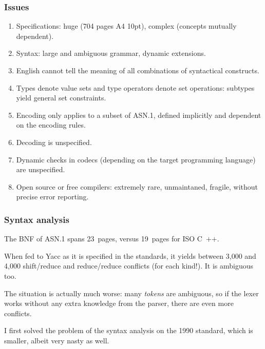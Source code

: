 \documentclass[compress,dvips,xcolor={dvipsnames},t]{beamer}
\newcommand\ASN{\textsf{ASN.1}\xspace}
\newcommand\Cpp{\mbox{\textsf{C} \hspace*{-2.5mm} \raise 0.7mm \hbox
{${\scriptscriptstyle \textsf{++}}$}}\xspace}
\begin{document}
\begin{frame}
\frametitle{Issues}

\begin{enumerate}

  \item Specifications: huge (704 pages A4 10pt), complex (concepts
  mutually dependent).

  \item Syntax: large and ambiguous grammar, dynamic extensions.

  \item English cannot tell the meaning of all combinations of
    syntactical constructs.

  \item Types denote value sets and type operators denote set
    operations: subtypes yield general set constraints.

  \item Encoding only applies to a subset of \ASN, defined
    implicitly and dependent on the encoding rules.

  \item Decoding is unspecified.

  \item Dynamic checks in codecs (depending on the target programming
    language) are unspecified.

  \item Open source or free compilers: extremely rare, unmaintaned,
    fragile, without precise error reporting.

\end{enumerate}

\end{frame}


\begin{frame}
\frametitle{Syntax analysis}

The BNF of \ASN spans 23~pages, versus 19~pages for ISO \Cpp.

\bigskip

When fed to Yacc as it is specified in the standards, it yields
between 3,000 and 4,000 shift/reduce and reduce/reduce conflicts
(for each kind!). It is ambiguous too.

\bigskip

The situation is actually much worse: many \emph{tokens} are
ambiguous, so if the lexer works without any extra knowledge from the
parser, there are even more conflicts.

\bigskip

I first solved the problem of the syntax analysis on the 1990
standard, which is smaller, albeit very nasty as well.

\end{frame}
\end{document}
